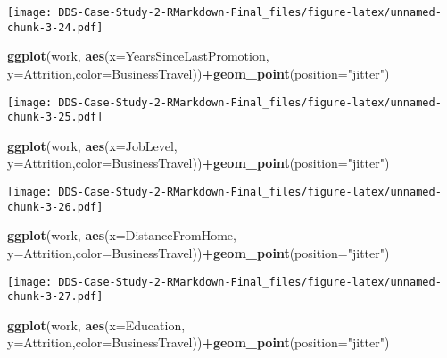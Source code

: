 \documentclass[]{article}
\newenvironment{Shaded}{\begin{snugshade}}{\end{snugshade}}
\newcommand{\DataTypeTok}[1]{\textcolor[rgb]{0.13,0.29,0.53}{#1}}
\newcommand{\KeywordTok}[1]{\textcolor[rgb]{0.13,0.29,0.53}{\textbf{#1}}}
\newcommand{\NormalTok}[1]{#1}
\newcommand{\OperatorTok}[1]{\textcolor[rgb]{0.81,0.36,0.00}{\textbf{#1}}}
\newcommand{\StringTok}[1]{\textcolor[rgb]{0.31,0.60,0.02}{#1}}
\begin{document}
\texttt{[image: DDS-Case-Study-2-RMarkdown-Final\_files/figure-latex/unnamed-chunk-3-24.pdf]}

\begin{Shaded}
\begin{Highlighting}[]
\KeywordTok{ggplot}\NormalTok{(work, }\KeywordTok{aes}\NormalTok{(}\DataTypeTok{x=}\NormalTok{YearsSinceLastPromotion, }\DataTypeTok{y=}\NormalTok{Attrition,}\DataTypeTok{color=}\NormalTok{BusinessTravel))}\OperatorTok{+}\KeywordTok{geom_point}\NormalTok{(}\DataTypeTok{position=}\StringTok{"jitter"}\NormalTok{)}
\end{Highlighting}
\end{Shaded}

\texttt{[image: DDS-Case-Study-2-RMarkdown-Final\_files/figure-latex/unnamed-chunk-3-25.pdf]}

\begin{Shaded}
\begin{Highlighting}[]
\KeywordTok{ggplot}\NormalTok{(work, }\KeywordTok{aes}\NormalTok{(}\DataTypeTok{x=}\NormalTok{JobLevel, }\DataTypeTok{y=}\NormalTok{Attrition,}\DataTypeTok{color=}\NormalTok{BusinessTravel))}\OperatorTok{+}\KeywordTok{geom_point}\NormalTok{(}\DataTypeTok{position=}\StringTok{"jitter"}\NormalTok{)}
\end{Highlighting}
\end{Shaded}

\texttt{[image: DDS-Case-Study-2-RMarkdown-Final\_files/figure-latex/unnamed-chunk-3-26.pdf]}

\begin{Shaded}
\begin{Highlighting}[]
\KeywordTok{ggplot}\NormalTok{(work, }\KeywordTok{aes}\NormalTok{(}\DataTypeTok{x=}\NormalTok{DistanceFromHome, }\DataTypeTok{y=}\NormalTok{Attrition,}\DataTypeTok{color=}\NormalTok{BusinessTravel))}\OperatorTok{+}\KeywordTok{geom_point}\NormalTok{(}\DataTypeTok{position=}\StringTok{"jitter"}\NormalTok{)}
\end{Highlighting}
\end{Shaded}

\texttt{[image: DDS-Case-Study-2-RMarkdown-Final\_files/figure-latex/unnamed-chunk-3-27.pdf]}

\begin{Shaded}
\begin{Highlighting}[]
\KeywordTok{ggplot}\NormalTok{(work, }\KeywordTok{aes}\NormalTok{(}\DataTypeTok{x=}\NormalTok{Education, }\DataTypeTok{y=}\NormalTok{Attrition,}\DataTypeTok{color=}\NormalTok{BusinessTravel))}\OperatorTok{+}\KeywordTok{geom_point}\NormalTok{(}\DataTypeTok{position=}\StringTok{"jitter"}\NormalTok{)}
\end{Highlighting}
\end{Shaded}
\end{document}

